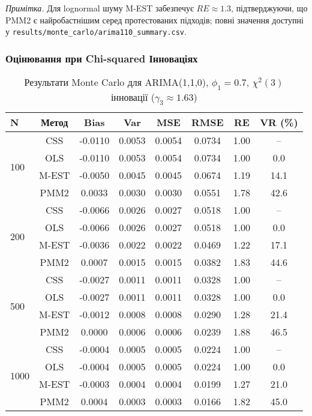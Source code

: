 \documentclass[12pt,a4paper]{article}
\begin{document}
\noindent\textit{Примітка.} Для lognormal шуму M-EST забезпечує $RE \approx 1.3$, підтверджуючи, що PMM2 є найробастнішим серед протестованих підходів; повні значення доступні у \texttt{results/monte\_carlo/arima110\_summary.csv}.

\subsubsection{Оцінювання при Chi-squared Інноваціях}

\begin{table}[h]
\centering
\caption{Результати Monte Carlo для ARIMA(1,1,0), $\phi_1 = 0.7$, $\chi^2(3)$ інновації ($\gamma_3 \approx 1.63$)}
\label{tab:arima110_chisq}
\begin{tabular}{@{}lccccccc@{}}
\toprule
\textbf{N} & \textbf{Метод} & \textbf{Bias} & \textbf{Var} & \textbf{MSE} & \textbf{RMSE} & \textbf{RE} & \textbf{VR (\%)} \\
\midrule
\multirow{4}{*}{100} & CSS  & -0.0110 & 0.0053 & 0.0054 & 0.0734 & 1.00 & -- \\
                     & OLS  & -0.0110 & 0.0053 & 0.0054 & 0.0734 & 1.00 & 0.0 \\
                     & M-EST & -0.0050 & 0.0045 & 0.0045 & 0.0674 & 1.19 & 14.1 \\
                     & PMM2 & 0.0033 & 0.0030 & 0.0030 & 0.0551 & 1.78 & 42.6 \\
\midrule
\multirow{4}{*}{200} & CSS  & -0.0066 & 0.0026 & 0.0027 & 0.0518 & 1.00 & -- \\
                     & OLS  & -0.0066 & 0.0026 & 0.0027 & 0.0518 & 1.00 & 0.0 \\
                     & M-EST & -0.0036 & 0.0022 & 0.0022 & 0.0469 & 1.22 & 17.1 \\
                     & PMM2 & 0.0007 & 0.0015 & 0.0015 & 0.0382 & 1.83 & 44.6 \\
\midrule
\multirow{4}{*}{500} & CSS  & -0.0027 & 0.0011 & 0.0011 & 0.0328 & 1.00 & -- \\
                     & OLS  & -0.0027 & 0.0011 & 0.0011 & 0.0328 & 1.00 & 0.0 \\
                     & M-EST & -0.0012 & 0.0008 & 0.0008 & 0.0290 & 1.28 & 21.4 \\
                     & PMM2 & 0.0000 & 0.0006 & 0.0006 & 0.0239 & 1.88 & 46.5 \\
\midrule
\multirow{4}{*}{1000} & CSS  & -0.0004 & 0.0005 & 0.0005 & 0.0224 & 1.00 & -- \\
                      & OLS  & -0.0004 & 0.0005 & 0.0005 & 0.0224 & 1.00 & 0.0 \\
                      & M-EST & -0.0003 & 0.0004 & 0.0004 & 0.0199 & 1.27 & 21.0 \\
                      & PMM2 & 0.0004 & 0.0003 & 0.0003 & 0.0166 & 1.82 & 45.0 \\
\bottomrule
\end{tabular}
\end{table}
\end{document}
